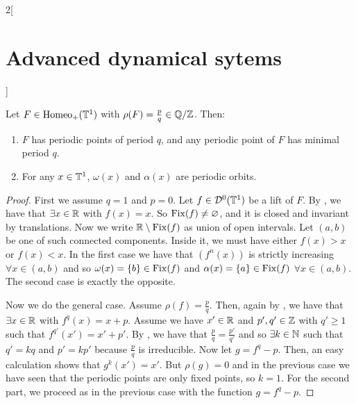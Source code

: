 \documentclass[../../../main_math.tex]{subfiles}
\begin{document}
\begin{multicols}{2}[\section{Advanced dynamical sytems}]
  \begin{theorem}
    Let $F\in \mathrm{Homeo}_+(\mathbb{T}^1)$ with $\rho(F)=\frac{p}{q}\in \quot{\QQ}{\ZZ}$. Then:
    \begin{enumerate}
      \item $F$ has periodic points of period $q$, and any periodic point of $F$ has minimal period $q$.
      \item For any $x\in \mathbb{T}^1$, $\omega(x)$ and $\alpha(x)$ are periodic orbits.
    \end{enumerate}
  \end{theorem}
  \begin{proof}
    First we assume $q=1$ and $p=0$. Let $f\in \mathcal{D}^0(\mathbb{T}^1)$ be a lift of $F$. By , we have that $\exists x\in \mathbb{R}$ with $f(x)=x$. So $\mathrm{Fix}(f)\ne \varnothing$, and it is closed and invariant by translations. Now we write $\mathbb{R}\setminus\mathrm{Fix}(f)$ as union of open intervals. Let $(a,b)$ be one of such connected components. Inside it, we must have either $f(x)>x$ or $f(x)<x$. In the first case we have that $(f^n(x))$ is strictly increasing $\forall x\in (a,b)$ and so $\omega(x)=\{b\}\in\mathrm{Fix}(f)$ and $\alpha(x)=\{a\}\in\mathrm{Fix}(f)$ $\forall x\in(a,b)$. The second case is exactly the opposite.

    Now we do the general case. Assume $\rho(f)=\frac{p}{q}$. Then, again by , we have that $\exists x\in \mathbb{R}$ with $f^q(x)=x+p$. Assume we have $x'\in\mathbb{R}$ and $p',q'\in\mathbb{Z}$ with $q'\geq 1$ such that $f^{q'}(x')=x'+p'$. By , we have that $\frac{p}{q}=\frac{p'}{q'}$ and so $\exists k\in\mathbb{N}$ such that $q'=kq$ and $p'=kp'$ because $\frac{p}{q}$ is irreducible. Now let $g=f^q-p$. Then, an easy calculation shows that $g^k(x')=x'$. But $\rho(g)=0$ and in the previous case we have seen that the periodic points are only fixed points, so $k=1$. For the second part, we proceed as in the previous case with the function $g=f^q-p$.
  \end{proof}

\end{multicols}
\end{document}
